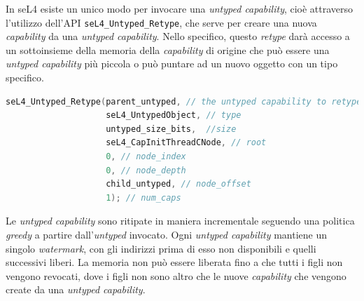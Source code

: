 In seL4 esiste un unico modo per invocare una \textit{untyped capability}, cioè attraverso l'utilizzo dell'API \texttt{seL4\_Untyped\_Retype}, che serve per creare una nuova \textit{capability} da una \textit{untyped capability}. Nello specifico, questo \textit{retype} darà accesso a un sottoinsieme della memoria della \textit{capability} di origine che può essere una \textit{untyped capability} più piccola o può puntare ad un nuovo oggetto con un tipo specifico.
\begin{lstlisting}[language=C++]
seL4_Untyped_Retype(parent_untyped, // the untyped capability to retype
                    seL4_UntypedObject, // type
                    untyped_size_bits,  //size
                    seL4_CapInitThreadCNode, // root
                    0, // node_index
                    0, // node_depth
                    child_untyped, // node_offset
                    1); // num_caps
\end{lstlisting}

Le \textit{untyped capability} sono ritipate in maniera incrementale seguendo una politica \textit{greedy} a partire dall'\textit{untyped} invocato. Ogni \textit{untyped capability} mantiene un singolo \textit{watermark}, con gli indirizzi prima di esso non disponibili e quelli successivi liberi. La memoria non può essere liberata fino a che tutti i figli non vengono revocati, dove i figli non sono altro che le nuove \textit{capability} che vengono create da una \textit{untyped capability}.

